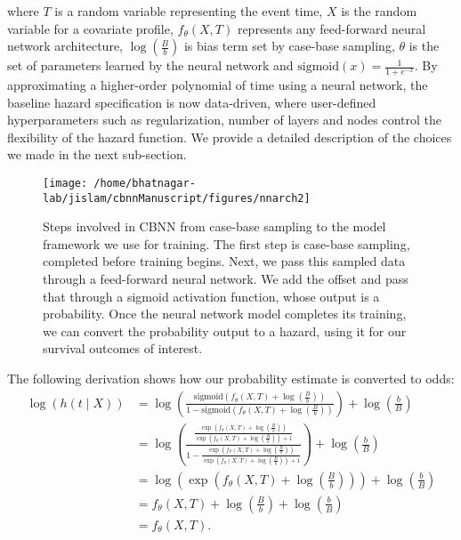 \documentclass[AMA,STIX1COL,]{WileyNJD-v2}
\begin{document}
where \(T\) is a random variable representing the event time, \(X\) is
the random variable for a covariate profile, \(f_{\theta}(X, T)\)
represents any feed-forward neural network architecture,
\(\log\left(\frac{B}{b}\right)\) is bias term set by case-base sampling,
\(\theta\) is the set of parameters learned by the neural network and
\(\mathrm{sigmoid}(x)=\frac{1}{1+e^{-x}}\). By approximating a
higher-order polynomial of time using a neural network, the baseline
hazard specification is now data-driven, where user-defined
hyperparameters such as regularization, number of layers and nodes
control the flexibility of the hazard function. We provide a detailed
description of the choices we made in the next sub-section.

\begin{figure}

{\centering \texttt{[image: /home/bhatnagar-lab/jislam/cbnnManuscript/figures/nnarch2]} 

}

\caption{Steps involved in CBNN from case-base sampling to the model framework we use for training. The first step is case-base sampling, completed before training begins. Next, we pass this sampled data through a feed-forward neural network. We add the offset and pass that through a sigmoid activation function, whose output is a probability. Once the neural network model completes its training, we can convert the probability output to a hazard, using it for our survival outcomes of interest.}\label{fig:NNarch}
\end{figure}

The following derivation shows how our probability estimate is converted
to odds: \begin{align*}
 \log\left( h(t \mid X) \right) &= \log\left(\frac{\mathrm{sigmoid}\left(f_{\theta}(X, T) + \log\left(\frac{B}{b}\right)\right)}{1-\mathrm{sigmoid}\left(f_{\theta}(X, T) + \log\left(\frac{B}{b}\right)\right)}\right) + \log\left(\frac{b}{B}\right) \\
 &= \log\left( \frac{\frac{\exp\left(f_{\theta}(X, T) + \log\left(\frac{B}{b}\right)\right)}{\exp\left(f_{\theta}(X, T) + \log\left(\frac{B}{b}\right)\right)+1}}{1-\frac{\exp\left(f_{\theta}(X, T) + \log\left(\frac{B}{b}\right)\right)}{\exp\left(f_{\theta}(X, T) + \log\left(\frac{B}{b}\right)\right)+1}}\right) + \log\left(\frac{b}{B}\right) \\
 &= \log\left(\exp\left( f_{\theta}(X, T) + \log\left(\frac{B}{b}\right) \right) \right) + \log\left(\frac{b}{B}\right) \\
 &= f_{\theta}(X, T) + \log\left(\frac{B}{b}\right) + \log\left(\frac{b}{B}\right) \\
&= f_{\theta}(X, T). 
\end{align*}
\end{document}
